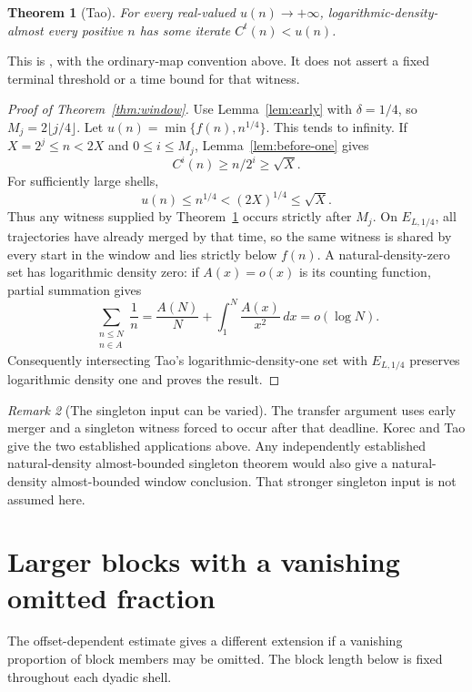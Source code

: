 \documentclass[11pt]{amsart}
\newtheorem{theorem}{Theorem}[section]
\theoremstyle{definition}
\theoremstyle{remark}
\newtheorem{remark}[theorem]{Remark}
\begin{document}
\begin{theorem}[Tao]\label{thm:tao}
For every real-valued $u(n)\to+\infty$, logarithmic-density-almost every positive $n$ has some iterate $C^t(n)<u(n)$.
\end{theorem}
This is \cite[Theorem~1.3]{Tao2022}, with the ordinary-map convention above. It does not assert a fixed terminal threshold or a time bound for that witness.

\begin{proof}[Proof of Theorem~\ref{thm:window}]
Use Lemma~\ref{lem:early} with $\delta=1/4$, so $M_j=2\lfloor j/4\rfloor$.
Let $u(n)=\min\{f(n),n^{1/4}\}$. This tends to infinity. If $X=2^j\le n<2X$ and $0\le i\le M_j$, Lemma~\ref{lem:before-one} gives
\[
 C^i(n)\ge n/2^i\ge\sqrt X.
\]
For sufficiently large shells,
\[
 u(n)\le n^{1/4}<(2X)^{1/4}\le\sqrt X.
\]
Thus any witness supplied by Theorem~\ref{thm:tao} occurs strictly after $M_j$. On $E_{L,1/4}$, all trajectories have already merged by that time, so the same witness is shared by every start in the window and lies strictly below $f(n)$.
A natural-density-zero set has logarithmic density zero: if $A(x)=o(x)$ is its counting function, partial summation gives
\[
 \sum_{\substack{n\le N\\n\in A}}\frac1n
 =\frac{A(N)}N+\int_1^N\frac{A(x)}{x^2}\,dx=o(\log N).
\]
Consequently intersecting Tao's logarithmic-density-one set with $E_{L,1/4}$ preserves logarithmic density one and proves the result.
\end{proof}

\begin{remark}[The singleton input can be varied]
The transfer argument uses early merger and a singleton witness forced to occur after that deadline. Korec and Tao give the two established applications above. Any independently established natural-density almost-bounded singleton theorem would also give a natural-density almost-bounded window conclusion. That stronger singleton input is not assumed here.
\end{remark}

\section{Larger blocks with a vanishing omitted fraction}\label{sec:majority}
The offset-dependent estimate gives a different extension if a vanishing proportion of block members may be omitted. The block length below is fixed throughout each dyadic shell.
\end{document}
